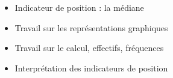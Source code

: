 \begin{prerequis}[Objectifs de 3\up{e}]    
    \begin{itemize}        
        \item Indicateur de position : la médiane
        \item Travail sur les représentations graphiques
        \item Travail sur le calcul, effectifs, fréquences
        \item Interprétation des indicateurs de position
    \end{itemize}
\end{prerequis}
